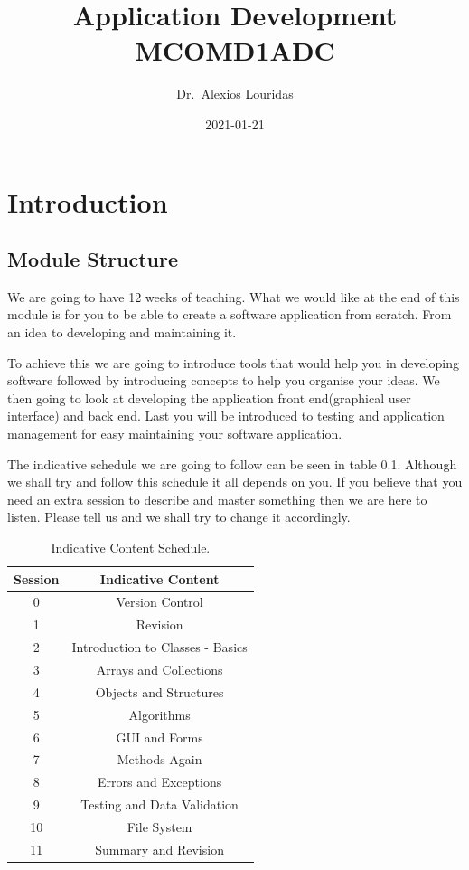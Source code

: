 \documentclass[
]{book}
\title{Application Development MCOMD1ADC}
\author{Dr.~Alexios Louridas}
\date{2021-01-21}
\begin{document}
\maketitle

{
\setcounter{tocdepth}{1}
\tableofcontents
}
\hypertarget{introduction}{%
\chapter*{Introduction}\label{introduction}}

\hypertarget{module-structure}{%
\section*{Module Structure}\label{module-structure}}

We are going to have 12 weeks of teaching. What we would like at the end of this module is for you to be able to create a software application from scratch. From an idea to developing and maintaining it.

To achieve this we are going to introduce tools that would help you in developing software followed by introducing concepts to help you organise your ideas. We then going to look at developing the application front end(graphical user interface) and back end. Last you will be introduced to testing and application management for easy maintaining your software application.

The indicative schedule we are going to follow can be seen in table 0.1. Although we shall try and follow this schedule it all depends on you. If you believe that you need an extra session to describe and master something then we are here to listen. Please tell us and we shall try to change it accordingly.

\begin{table}

\caption{\label{tab:unnamed-chunk-1}Indicative Content Schedule.}
\centering
\begin{tabular}[t]{c|c}
\hline
Session & Indicative Content\\
\hline
0 & Version Control\\
\hline
1 & Revision\\
\hline
2 & Introduction to Classes - Basics\\
\hline
3 & Arrays and Collections\\
\hline
4 & Objects and Structures\\
\hline
5 & Algorithms\\
\hline
6 & GUI and Forms\\
\hline
7 & Methods Again\\
\hline
8 & Errors and Exceptions\\
\hline
9 & Testing and Data Validation\\
\hline
10 & File System\\
\hline
11 & Summary and Revision\\
\hline
\end{tabular}
\end{table}
\end{document}
